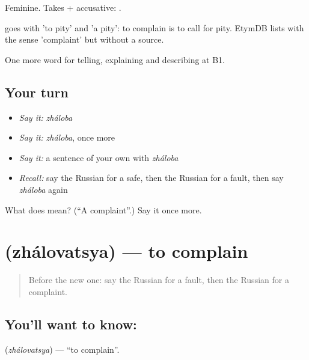 Feminine. Takes \emph{} + accusative: \emph{  }.

\begin{cousinweb}
\emph{} goes with \emph{} 'to pity' and \emph{} 'a pity': to complain is to call for pity. EtymDB lists \emph{} with the sense 'complaint' but without a source.
\end{cousinweb}

\begin{grammarlens}[title={What you've built}]
One more word for telling, explaining and describing at B1.
\end{grammarlens}

\subsection*{Your turn}
\begin{itemize}
\raggedright
  \item \emph{Say it:} \emph{zháloba}
  \item \emph{Say it:} \emph{zháloba}, once more
  \item \emph{Say it:} a sentence of your own with \emph{zháloba}
  \item \emph{Recall:} say the Russian for a safe, then the Russian for a fault, then say \emph{zháloba} again
\end{itemize}

\begin{tcolorbox}[breakable,colback=teal!4,colframe=teal!35!black,title={Before you move on}]
What does  mean? (\textquotedblleft{}A complaint\textquotedblright{}.) Say it once more.
\end{tcolorbox}
\section[\texorpdfstring{\ru{жаловаться} (zhálovatsya)}{жаловаться (zhálovatsya)}]{ (zhálovatsya) — to complain}

\label{lesson:RU-C434-zhalovatsya}



\begin{quote}
Before the new one: say the Russian for a fault, then the Russian for a complaint.
\end{quote}

\subsection*{You'll want to know: }
\textbf{} (\emph{zhálovatsya}) — \textquotedblleft{}to complain\textquotedblright{}.

